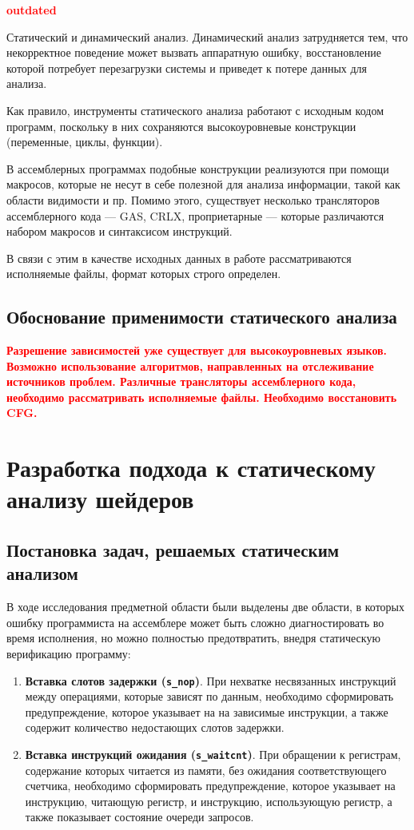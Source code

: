 \documentclass[a4paper,14pt]{extarticle}
\newcommand{\todo}[1]{\textbf{\textcolor{red}{#1}}}
\newenvironment{ol}{\begin{enumerate}[noitemsep,topsep=0em]}{\end{enumerate}\vspace{4mm}}
\begin{document}
\todo{outdated}

Статический и динамический анализ. Динамический анализ затрудняется тем, что некорректное
поведение может вызвать аппаратную ошибку, восстановление которой потребует перезагрузки
системы и приведет к потере данных для анализа.  %

Как правило, инструменты статического анализа работают с исходным кодом программ,
поскольку в них сохраняются высокоуровневые конструкции (переменные, циклы, функции).

В ассемблерных программах подобные конструкции реализуются при помощи макросов,
которые не несут в себе полезной для анализа информации, такой как области видимости и пр.
Помимо этого, существует несколько трансляторов ассемблерного кода — GAS, CRLX, проприетарные — которые
различаются набором макросов и синтаксисом инструкций.

В связи с этим в качестве исходных данных в работе рассматриваются исполняемые файлы,
формат которых строго определен.

\subsection{Обоснование применимости статического анализа}

\todo{Разрешение зависимостей уже существует для высокоуровневых языков. Возможно использование алгоритмов, направленных на отслеживание источников проблем. Различные трансляторы ассемблерного кода, необходимо рассматривать исполняемые файлы. Необходимо восстановить CFG.}

\section{Разработка подхода к статическому анализу шейдеров}

\subsection{Постановка задач, решаемых статическим анализом}

В ходе исследования предметной области были выделены две области, в которых ошибку программиста
на ассемблере может быть сложно диагностировать во время исполнения, но можно полностью
предотвратить, внедря статическую верификацию программу:
\begin{ol}
\item \textbf{Вставка слотов задержки (\texttt{s\_nop})}. При нехватке несвязанных инструкций между операциями, которые зависят по данным, необходимо сформировать предупреждение, которое указывает на
на зависимые инструкции, а также содержит количество недостающих слотов задержки.
\item \textbf{Вставка инструкций ожидания (\texttt{s\_waitcnt})}. При обращении к регистрам, содержание которых читается из памяти, без ожидания соответствующего счетчика, необходимо сформировать предупреждение, которое указывает на инструкцию, читающую регистр, и инструкцию, использующую регистр, а также показывает состояние очереди запросов.
\end{ol}
\end{document}
